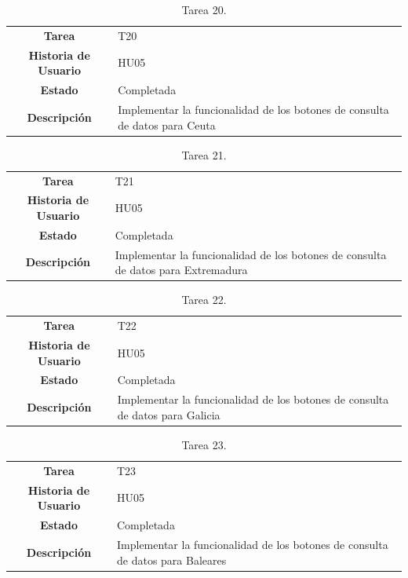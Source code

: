 \begin{table}[H]
	\begin{center}
		\begin{tabular}{| c | p{9cm} |}
			\hline
			
			\textbf{Tarea} & T20 \\
			\textbf{Historia de Usuario} & HU05 \\
			\textbf{Estado} & Completada \\
			\textbf{Descripción} & Implementar la funcionalidad de los botones de consulta de datos para Ceuta \\ \hline
		\end{tabular}
		\caption{Tarea 20.}
	\end{center}
\end{table}

\begin{table}[H]
	\begin{center}
		\begin{tabular}{| c | p{9cm} |}
			\hline
			
			\textbf{Tarea} & T21 \\
			\textbf{Historia de Usuario} & HU05 \\
			\textbf{Estado} & Completada \\
			\textbf{Descripción} & Implementar la funcionalidad de los botones de consulta de datos para Extremadura \\ \hline
		\end{tabular}
		\caption{Tarea 21.}
	\end{center}
\end{table}

\begin{table}[H]
	\begin{center}
		\begin{tabular}{| c | p{9cm} |}
			\hline
			
			\textbf{Tarea} & T22 \\
			\textbf{Historia de Usuario} & HU05 \\
			\textbf{Estado} & Completada \\
			\textbf{Descripción} & Implementar la funcionalidad de los botones de consulta de datos para Galicia \\ \hline
		\end{tabular}
		\caption{Tarea 22.}
	\end{center}
\end{table}

\begin{table}[H]
	\begin{center}
		\begin{tabular}{| c | p{9cm} |}
			\hline
			
			\textbf{Tarea} & T23 \\
			\textbf{Historia de Usuario} & HU05 \\
			\textbf{Estado} & Completada \\
			\textbf{Descripción} & Implementar la funcionalidad de los botones de consulta de datos para Baleares \\ \hline
		\end{tabular}
		\caption{Tarea 23.}
	\end{center}
\end{table}

